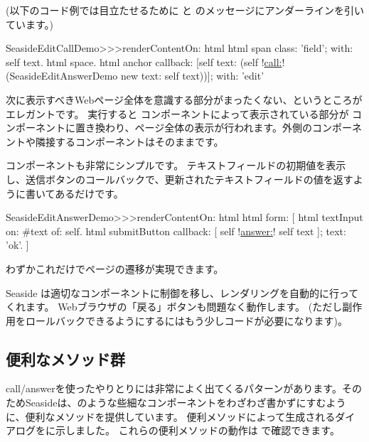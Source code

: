 \documentclass[a4paper,10pt,twoside]{book}
\begin{document}
(以下のコード例では目立たせるために  と  のメッセージにアンダーラインを引いています。)

\begin{code}{}
SeasideEditCallDemo>>>renderContentOn: html 
	html span
		class: 'field';
		with: self text.
	html space.
	html anchor
		callback: [self text: (self !\underline{call:}! (SeasideEditAnswerDemo new text: self text))];
		with: 'edit'
\end{code}{}

次に表示すべきWebページ全体を意識する部分がまったくない、というところがエレガントです。
実行すると  コンポーネントによって表示されている部分が  コンポーネントに置き換わり、ページ全体の表示が行われます。外側のコンポーネントや隣接するコンポーネントはそのままです。


 コンポーネントも非常にシンプルです。
テキストフィールドの初期値を表示し、送信ボタンのコールバックで、更新されたテキストフィールドの値を返すように書いてあるだけです。

\begin{code}{}
SeasideEditAnswerDemo>>>renderContentOn: html
	html form: [
		html textInput
			on: #text of: self.
		html submitButton
			callback: [ self !\underline{answer:}! self text ];
			text: 'ok'.
		]
\end{code}{}

わずかこれだけでページの遷移が実現できます。

Seaside は適切なコンポーネントに制御を移し、レンダリングを自動的に行ってくれます。
Webブラウザの「戻る」ボタンも問題なく動作します。 (ただし副作用をロールバックできるようにするにはもう少しコードが必要になります)。

\subsection{便利なメソッド群}

call/answerを使ったやりとりには非常によく出てくるパターンがあります。そのためSeasideは、のような些細なコンポーネントをわざわざ書かずにすむように、便利なメソッドを提供しています。
便利メソッドによって生成されるダイアログをに示しました。
これらの便利メソッドの動作は で確認できます。
\end{document}
